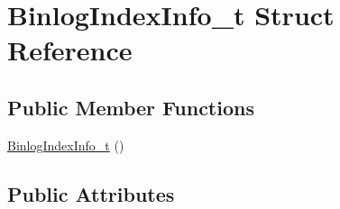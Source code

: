 \hypertarget{structBinlogIndexInfo__t}{\section{Binlog\-Index\-Info\-\_\-t Struct Reference}
\label{structBinlogIndexInfo__t}
}
\subsection*{Public Member Functions}
\begin{DoxyCompactItemize}
\item 
\hyperlink{structBinlogIndexInfo__t_a362dec68271ebe2c034af1880410ee97}{Binlog\-Index\-Info\-\_\-t} ()
\end{DoxyCompactItemize}
\subsection*{Public Attributes}
